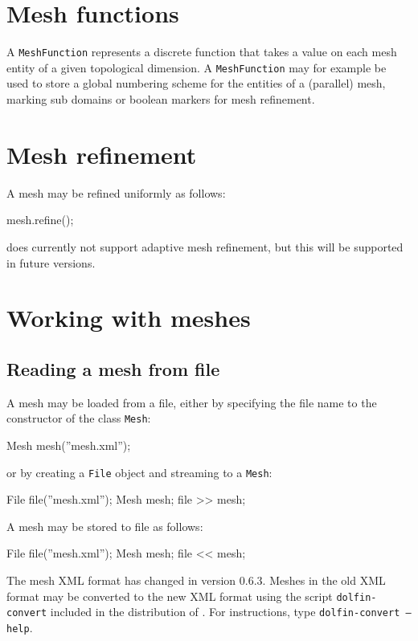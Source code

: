 \section{Mesh functions}

A \texttt{MeshFunction} represents a discrete function that takes a
value on each mesh entity of a given topological dimension.
A \texttt{MeshFunction} may for example be used to store a global
numbering scheme for the entities of a (parallel) mesh, marking
sub domains or boolean markers for mesh refinement.

\section{Mesh refinement}

A mesh may be refined uniformly as follows:
\begin{code}
mesh.refine();
\end{code}
\dolfin{} does currently not support adaptive mesh refinement, but
this will be supported in future versions.

\section{Working with meshes}

\subsection{Reading a mesh from file}

A mesh may be loaded from a file, either by specifying the file name
to the constructor of the class \texttt{Mesh}:
\begin{code}
Mesh mesh(''mesh.xml'');
\end{code}
or by creating a \texttt{File} object and streaming to a
\texttt{Mesh}:
\begin{code}
File file(''mesh.xml'');
Mesh mesh;
file >> mesh;
\end{code}
A mesh may be stored to file as follows:
\begin{code}
File file(''mesh.xml'');
Mesh mesh;
file << mesh;
\end{code}

The \dolfin{} mesh XML format has changed in \dolfin{} version
0.6.3. Meshes in the old XML format may be converted to the new XML
format using the script \texttt{dolfin-convert} included in the
distribution of \dolfin{}. For instructions, type
\texttt{dolfin-convert --help}.

